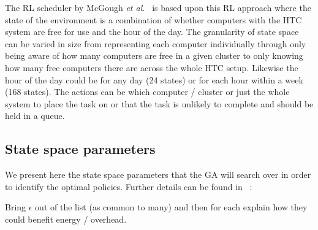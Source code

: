 \documentclass[10pt, conference, compsocconf]{IEEEtran}
\begin{document}
The RL scheduler by McGough {\em et al.}~\cite{suscom} is based upon this RL approach where the state of the environment is a combination of whether computers with the HTC system are free for use and the hour of the day. The granularity of state space can be varied in size from representing each computer individually through only being aware of how many computers are free in a given cluster to only knowing how many free computers there are across the whole HTC setup. Likewise the hour of the day could be for any day (24 states) or for each hour within a week (168 states). The actions can be which computer / cluster or just the whole system to place the task on or that the task is unlikely to complete and should be held in a queue.			


\subsection{State space parameters}
We present here the state space parameters that the GA will search over in order to identify the optimal policies. Further details can be found in ~\cite{suscom}:

{\color{red}Bring $\epsilon$ out of the list (as common to many) and then for each explain how they could benefit energy / overhead.}
\end{document}
